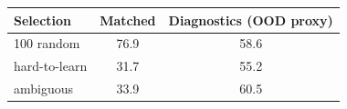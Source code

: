 \begin{tabular}{lcc}
Selection & Matched & Diagnostics (OOD proxy) \\
\hline
100%
random & 76.9 & 58.6 \\
hard-to-learn & 31.7 & 55.2 \\
ambiguous & 33.9 & 60.5 \\
\end{tabular}
